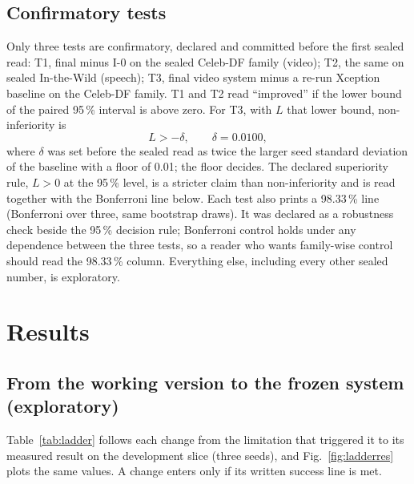 \documentclass[conference,a4paper]{IEEEtran_nodash}
\begin{document}
\subsection{Confirmatory tests}
Only three tests are confirmatory, declared and committed before the first sealed
read: T1, final minus I-0 on the sealed Celeb-DF family (video); T2, the same on
sealed In-the-Wild (speech); T3, final video system minus a re-run Xception
baseline on the Celeb-DF family. T1 and T2 read ``improved'' if the lower bound of
the paired 95\,\% interval is above zero. For T3, with $L$ that lower bound, non-inferiority is
\begin{equation}
L>-\delta,\qquad \delta=0.0100,
\end{equation}
where $\delta$ was set before the sealed read as twice the larger seed standard
deviation of the baseline with a floor of 0.01; the floor decides. The declared
superiority rule, $L>0$ at the 95\,\% level, is a stricter claim than non-inferiority
and is read together with the Bonferroni line below. Each test also
prints a 98.33\,\% line (Bonferroni over three, same bootstrap draws). It was
declared as a robustness check beside the 95\,\% decision rule; Bonferroni control
holds under any dependence between the three tests, so a reader who wants
family-wise control should read the 98.33\,\% column. Everything else, including
every other sealed number, is exploratory. %

\section{Results}\label{sec:results}

\subsection{From the working version to the frozen system (exploratory)}
Table~\ref{tab:ladder} follows each change from the limitation that triggered it
to its measured result on the development slice (three seeds), and
Fig.~\ref{fig:ladderres} plots the same values. A change enters only if its
written success line is met. %
\end{document}
